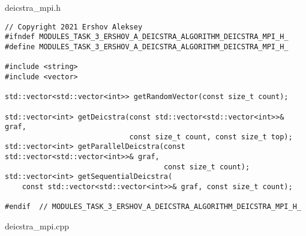 \documentclass{report}
\begin{document}
deicstra\_mpi.h
\begin{lstlisting}
// Copyright 2021 Ershov Aleksey
#ifndef MODULES_TASK_3_ERSHOV_A_DEICSTRA_ALGORITHM_DEICSTRA_MPI_H_
#define MODULES_TASK_3_ERSHOV_A_DEICSTRA_ALGORITHM_DEICSTRA_MPI_H_

#include <string>
#include <vector>

std::vector<std::vector<int>> getRandomVector(const size_t count);

std::vector<int> getDeicstra(const std::vector<std::vector<int>>& graf,
                             const size_t count, const size_t top);
std::vector<int> getParallelDeicstra(const std::vector<std::vector<int>>& graf,
                                     const size_t count);
std::vector<int> getSequentialDeicstra(
    const std::vector<std::vector<int>>& graf, const size_t count);

#endif  // MODULES_TASK_3_ERSHOV_A_DEICSTRA_ALGORITHM_DEICSTRA_MPI_H_

\end{lstlisting}
deicstra\_mpi.cpp
\end{document}
